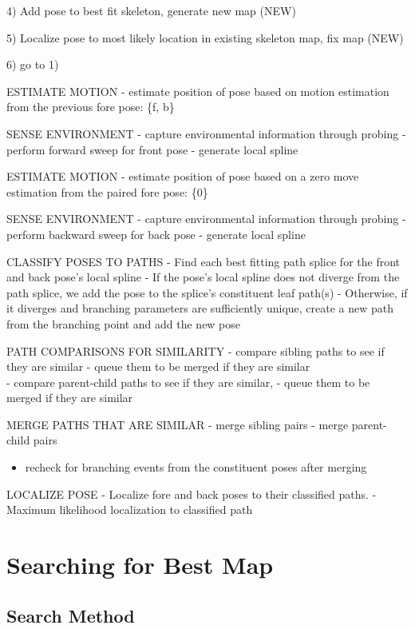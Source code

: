 4) Add pose to best fit skeleton, generate new map (NEW)

5) Localize pose to most likely location in existing skeleton map, fix map (NEW)

6) go to 1)

ESTIMATE MOTION
- estimate position of pose based on motion estimation from the previous fore pose: \{f, b\}

SENSE ENVIRONMENT
- capture environmental information through probing
 - perform forward sweep for front pose
 - generate local spline

ESTIMATE MOTION
- estimate position of pose based on a zero move estimation from the paired fore pose: \{0\}

SENSE ENVIRONMENT
- capture environmental information through probing
 - perform backward sweep for back pose
 - generate local spline

CLASSIFY POSES TO PATHS
- Find each best fitting path splice for the front and back pose's local spline
 - If the pose's local spline does not diverge from the path splice, we add the pose to the splice's constituent leaf path(s)
 - Otherwise, if it diverges and branching parameters are sufficiently unique, create a new path from the branching point and add the new pose

PATH COMPARISONS FOR SIMILARITY
- compare sibling paths to see if they are similar
 - queue them to be merged if they are similar\\
- compare parent-child paths to see if they are similar,
 - queue them to be merged if they are similar

MERGE PATHS THAT ARE SIMILAR
- merge sibling pairs
- merge parent-child pairs

\begin{itemize}
\item recheck for branching events from the constituent poses after merging

\end{itemize}

LOCALIZE POSE
- Localize fore and back poses to their classified paths.
- Maximum likelihood localization to classified path

\pagebreak 

\chapter{Searching for Best Map}
\label{searchingforbestmap}

\section{Search Method}
\label{searchmethod}

